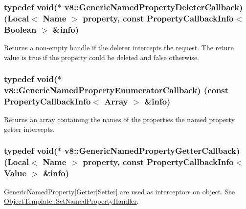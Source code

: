 \subsubsection[{\texorpdfstring{Generic\+Named\+Property\+Deleter\+Callback}{GenericNamedPropertyDeleterCallback}}]{\setlength{\rightskip}{0pt plus 5cm}typedef void($\ast$ v8\+::\+Generic\+Named\+Property\+Deleter\+Callback) ({\bf Local}$<$ {\bf Name} $>$ property, const {\bf Property\+Callback\+Info}$<$ {\bf Boolean} $>$ \&info)}\hypertarget{namespacev8_ad2aecc0406ea4bc02d5a4f84a433b273}{}\label{namespacev8_ad2aecc0406ea4bc02d5a4f84a433b273}
Returns a non-\/empty handle if the deleter intercepts the request. The return value is true if the property could be deleted and false otherwise. 
\subsubsection[{\texorpdfstring{Generic\+Named\+Property\+Enumerator\+Callback}{GenericNamedPropertyEnumeratorCallback}}]{\setlength{\rightskip}{0pt plus 5cm}typedef void($\ast$ v8\+::\+Generic\+Named\+Property\+Enumerator\+Callback) (const {\bf Property\+Callback\+Info}$<$ {\bf Array} $>$ \&info)}\hypertarget{namespacev8_a20826eb7e52e84fa4f632534e8eddd04}{}\label{namespacev8_a20826eb7e52e84fa4f632534e8eddd04}
Returns an array containing the names of the properties the named property getter intercepts. 
\subsubsection[{\texorpdfstring{Generic\+Named\+Property\+Getter\+Callback}{GenericNamedPropertyGetterCallback}}]{\setlength{\rightskip}{0pt plus 5cm}typedef void($\ast$ v8\+::\+Generic\+Named\+Property\+Getter\+Callback) ({\bf Local}$<$ {\bf Name} $>$ property, const {\bf Property\+Callback\+Info}$<$ {\bf Value} $>$ \&info)}\hypertarget{namespacev8_a24b1801fa53a7c5a71366d8044927563}{}\label{namespacev8_a24b1801fa53a7c5a71366d8044927563}
Generic\+Named\+Property\mbox{[}Getter$\vert$\+Setter\mbox{]} are used as interceptors on object. See \hyperlink{classv8_1_1_object_template_a66fa7b04c87676e20e35497ea09a0ad0}{Object\+Template\+::\+Set\+Named\+Property\+Handler}. 
